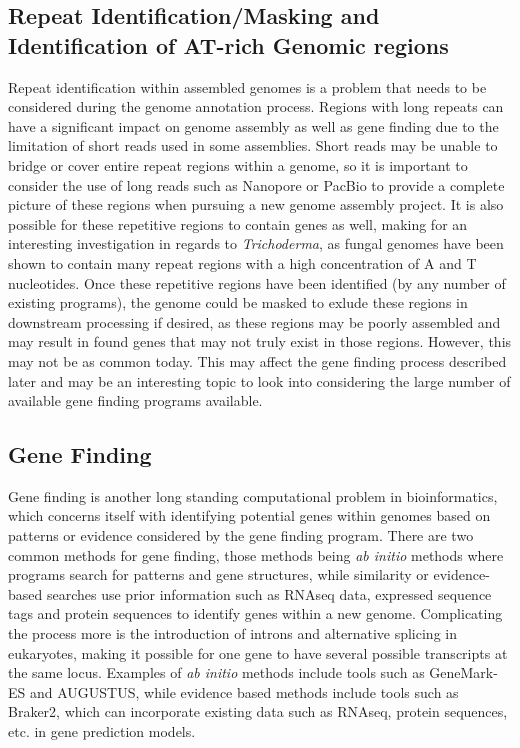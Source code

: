 \documentclass[12pt]{article}
\begin{document}
\subsection{Repeat Identification/Masking and Identification of AT-rich Genomic regions}
Repeat identification within assembled genomes is a problem that
needs to be considered during the genome annotation process. Regions
with long repeats can have a significant impact on genome assembly as
well as gene finding due to the limitation of short reads used in some
assemblies\cite{Repeats}. Short reads may be unable to bridge or cover
entire repeat regions within a genome, so it is important to consider
the use of long reads such as Nanopore or PacBio to provide a complete
picture of these regions when pursuing a new genome assembly
project. It is also possible for these repetitive regions to contain
genes as well, making for an interesting investigation in regards to
\textit{Trichoderma}, as fungal genomes have been shown to contain
many repeat regions with a high concentration of A and T
nucleotides\cite{fungalrepeats}. Once these repetitive regions have
been identified (by any number of existing programs), the genome could
be masked to exlude these regions in downstream processing if desired,
as these regions may be poorly assembled and may result in found genes
that may not truly exist in those regions. However, this may not be as
common today\cite{dontMask}. This may affect the gene finding process
described later and may be an interesting topic to look into
considering the large number of available gene finding programs
available.

\subsection{Gene Finding}
Gene finding is another long standing computational problem in
bioinformatics, which concerns itself with identifying potential genes
within genomes based on patterns or evidence considered by the gene
finding program. There are two common methods for gene finding, those
methods being \textit{ab initio} methods where programs search for
patterns and gene structures, while similarity or evidence-based
searches use prior information such as RNAseq data, expressed sequence
tags and protein sequences to identify genes within a new
genome\cite{GeneFinding}. Complicating the process more is the
introduction of introns and alternative splicing in eukaryotes, making
it possible for one gene to have several possible transcripts at the
same locus. Examples of \textit{ab initio} methods include tools such
as GeneMark-ES\cite{GeneMarkES} and AUGUSTUS\cite{AUGUSTUS}, while
evidence based methods include tools such as Braker2\cite{Braker2},
which can incorporate existing data such as RNAseq, protein sequences, 
etc. in gene prediction models.
\end{document}
